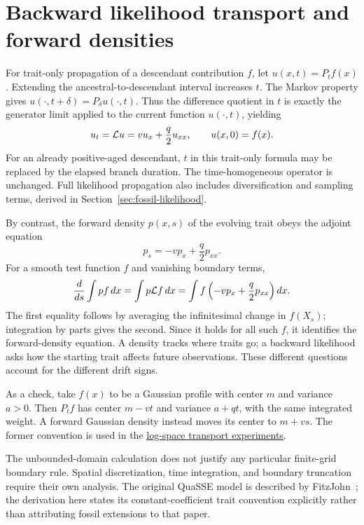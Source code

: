 \documentclass[11pt]{article}
\begin{document}
\section{Backward likelihood transport and forward densities}
For trait-only propagation of a descendant contribution $f$, let $u(x,t)=P_t f(x)$. Extending the
ancestral-to-descendant interval increases $t$. The Markov property gives
$u(\cdot,t+\delta)=P_\delta u(\cdot,t)$. Thus the difference quotient in $t$ is exactly
the generator limit applied to the current function $u(\cdot,t)$, yielding
\begin{equation}\label{eq:backward-transport}
 u_t=\mathcal{L} u=v u_x+\frac q2 u_{xx},\qquad u(x,0)=f(x).
\end{equation}
For an already positive-aged descendant, $t$ in this trait-only formula may be replaced by the
elapsed branch duration. The time-homogeneous operator is unchanged. Full likelihood propagation
also includes diversification and sampling terms, derived in Section~\ref{sec:fossil-likelihood}.

By contrast, the forward density $p(x,s)$ of the evolving trait obeys the adjoint equation
\begin{equation}\label{eq:forward-density}
 p_s=-v p_x+\frac q2 p_{xx}.
\end{equation}
For a smooth test function $f$ and vanishing boundary terms,
\[
 \frac{d}{ds}\int p f\,dx=\int p\mathcal{L} f\,dx
 =\int f\left(-v p_x+\frac q2 p_{xx}\right)dx.
\]
The first equality follows by averaging the infinitesimal change in $f(X_s)$; integration by
parts gives the second. Since it holds for all such $f$, it identifies the forward-density
equation. A density tracks where traits go; a backward likelihood asks how the starting trait
affects future observations. These different questions account for the different drift signs.

As a check, take $f(x)$ to be a Gaussian profile with center $m$ and variance $a>0$. Then $P_t f$
has center $m-vt$ and variance $a+qt$, with the same integrated weight. A forward Gaussian density
instead moves its center to $m+vs$. The former convention is used in the
\href{../../validation/log_pde/README.md}{log-space transport experiments}.

The unbounded-domain calculation does not justify any particular finite-grid boundary rule.
Spatial discretization, time integration, and boundary truncation require their own analysis.
The original QuaSSE model is described by FitzJohn~\cite{fitzjohn2010}; the derivation here states
its constant-coefficient trait convention explicitly rather than attributing fossil extensions to
that paper.
\end{document}
